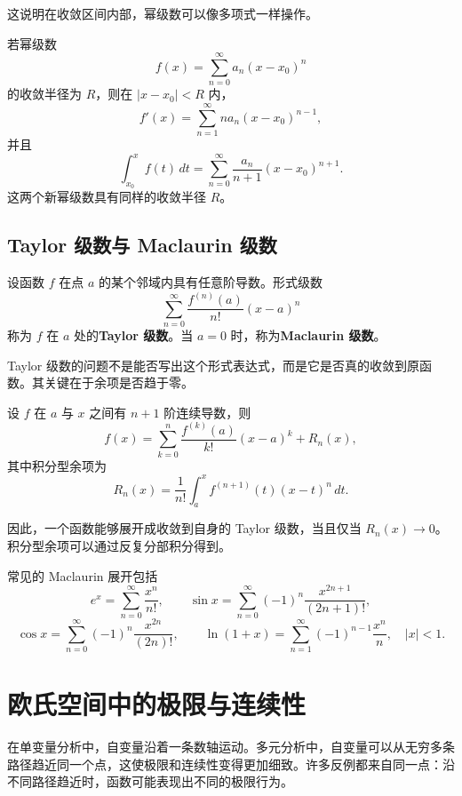 这说明在收敛区间内部，幂级数可以像多项式一样操作。

\begin{theorem}[逐项求导与逐项积分]
若幂级数
\[
    f(x)=\sum_{n=0}^{\infty}a_n(x-x_0)^n
\]
的收敛半径为 $R$，则在 $|x-x_0|<R$ 内，
\[
    f'(x)=\sum_{n=1}^{\infty}na_n(x-x_0)^{n-1},
\]
并且
\[
    \int_{x_0}^{x}f(t)\,dt
    =\sum_{n=0}^{\infty}\frac{a_n}{n+1}(x-x_0)^{n+1}.
\]
这两个新幂级数具有同样的收敛半径 $R$。
\end{theorem}

\subsection{Taylor 级数与 Maclaurin 级数}

\begin{definition}[Taylor 级数]
设函数 $f$ 在点 $a$ 的某个邻域内具有任意阶导数。形式级数
\[
    \sum_{n=0}^{\infty}\frac{f^{(n)}(a)}{n!}(x-a)^n
\]
称为 $f$ 在 $a$ 处的\textbf{Taylor 级数}。当 $a=0$ 时，称为\textbf{Maclaurin 级数}。
\end{definition}

Taylor 级数的问题不是能否写出这个形式表达式，而是它是否真的收敛到原函数。其关键在于余项是否趋于零。

\begin{theorem}[Taylor 公式]
设 $f$ 在 $a$ 与 $x$ 之间有 $n+1$ 阶连续导数，则
\[
    f(x)=\sum_{k=0}^{n}\frac{f^{(k)}(a)}{k!}(x-a)^k+R_n(x),
\]
其中积分型余项为
\[
    R_n(x)=\frac1{n!}\int_a^x f^{(n+1)}(t)(x-t)^n\,dt.
\]
\end{theorem}

因此，一个函数能够展开成收敛到自身的 Taylor 级数，当且仅当 $R_n(x)\to0$。积分型余项可以通过反复分部积分得到。

常见的 Maclaurin 展开包括
\[
    e^x=\sum_{n=0}^{\infty}\frac{x^n}{n!},
    \qquad
    \sin x=\sum_{n=0}^{\infty}(-1)^n\frac{x^{2n+1}}{(2n+1)!},
\]
\[
    \cos x=\sum_{n=0}^{\infty}(-1)^n\frac{x^{2n}}{(2n)!},
    \qquad
    \ln(1+x)=\sum_{n=1}^{\infty}(-1)^{n-1}\frac{x^n}{n},\quad |x|<1.
\]


\section{欧氏空间中的极限与连续性}

在单变量分析中，自变量沿着一条数轴运动。多元分析中，自变量可以从无穷多条路径趋近同一个点，这使极限和连续性变得更加细致。许多反例都来自同一点：沿不同路径趋近时，函数可能表现出不同的极限行为。

